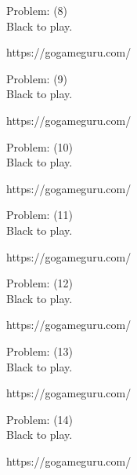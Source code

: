 \documentclass[11pt]{article}
\begin{document}
\begin{minipage}[t]{0.5\textwidth}
  {\centering
  
  Problem: (8)\\
  Black to play.

https://gogameguru.com/\\
  }
\end{minipage}
\begin{minipage}[t]{0.5\textwidth}
  {\centering
  
  Problem: (9)\\
  Black to play.

https://gogameguru.com/\\
  }
\end{minipage}
\begin{minipage}[t]{0.5\textwidth}
  {\centering
  
  Problem: (10)\\
  Black to play.

https://gogameguru.com/\\
  }
\end{minipage}
\begin{minipage}[t]{0.5\textwidth}
  {\centering
  
  Problem: (11)\\
  Black to play.

https://gogameguru.com/\\
  }
\end{minipage}
\begin{minipage}[t]{0.5\textwidth}
  {\centering
  
  Problem: (12)\\
  Black to play.

https://gogameguru.com/\\
  }
\end{minipage}
\begin{minipage}[t]{0.5\textwidth}
  {\centering
  
  Problem: (13)\\
  Black to play.

https://gogameguru.com/\\
  }
\end{minipage}
\begin{minipage}[t]{0.5\textwidth}
  {\centering
  
  Problem: (14)\\
  Black to play.

https://gogameguru.com/\\
  }
\end{minipage}
\end{document}
